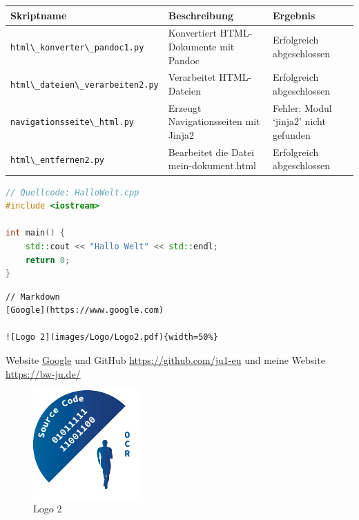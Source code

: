 \documentclass{vorlage-design-main}
\begin{document}
\begin{table}[ht]
  \begin{tabular}{@{}lll@{}}
\toprule
Skriptname
 &
Beschreibung
 &
Ergebnis
 \\
\midrule[\heavyrulewidth]
\verb|html\_konverter\_pandoc1.py| & Konvertiert
HTML-Dokumente mit Pandoc & Erfolgreich abgeschlossen \\
\verb|html\_dateien\_verarbeiten2.py| & Verarbeitet
HTML-Dateien & Erfolgreich abgeschlossen \\
\verb|navigationsseite\_html.py| & Erzeugt
Navigationsseiten mit Jinja2 & Fehler: Modul `jinja2' nicht gefunden \\
\verb|html\_entfernen2.py| & Bearbeitet die Datei
mein-dokument.html & Erfolgreich abgeschlossen \\
\bottomrule
\end{tabular}%
\end{table}

\newpage

\begin{lstlisting}[language={C++}]
// Quellcode: HalloWelt.cpp
#include <iostream>

int main() {
    std::cout << "Hallo Welt" << std::endl;
    return 0;
}
\end{lstlisting}

\begin{lstlisting}
// Markdown
[Google](https://www.google.com)

![Logo 2](images/Logo/Logo2.pdf){width=50%}
\end{lstlisting}

Website \href{https://www.google.com}{Google} und GitHub
\url{https://github.com/ju1-eu} und meine Website
\url{https://bw-ju.de/}

\begin{figure}
\centering
\includegraphics[width=0.4\linewidth,keepaspectratio]{images/Logo/Logo2.pdf}
\caption{Logo 2}
\end{figure}
\end{document}
